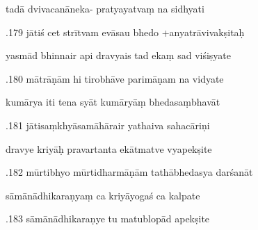 \documentclass[article,12pt,a4paper]{memoir}%
\newcounter{parCount}
\begin{document}
	  
	  \pstart \leavevmode%
	tadā dvivacanāneka- pratyayatvaṃ na sidhyati 
	{}
	\pend%
      

	  
	  \pstart {}.179 jātiś cet strītvam evāsau bhedo +anyatrāvivakṣitaḥ 
	{}
	\pend%
      

	  
	  \pstart \leavevmode%
	yasmād bhinnair api dravyais tad ekaṃ sad viśiṣyate 
	{}
	\pend%
      

	  
	  \pstart {}.180 mātrāṇām hi tirobhāve parimāṇam na vidyate 
	{}
	\pend%
      

	  
	  \pstart \leavevmode%
	kumārya iti tena syāt kumāryāṃ bhedasaṃbhavāt 
	{}
	\pend%
      

	  
	  \pstart {}.181 jātisaṃkhyāsamāhārair yathaiva sahacāriṇi 
	{}
	\pend%
      

	  
	  \pstart \leavevmode%
	dravye kriyāḥ pravartanta ekātmatve vyapekṣite 
	{}
	\pend%
      

	  
	  \pstart {}.182 mūrtibhyo mūrtidharmāṇām tathābhedasya darśanāt 
	{}
	\pend%
      

	  
	  \pstart \leavevmode%
	sāmānādhikaraṇyaṃ ca kriyāyogaś ca kalpate 
	{}
	\pend%
      

	  
	  \pstart {}.183 sāmānādhikaraṇye tu matublopād apekṣite 
	{}
	\pend%
      
\end{document}
